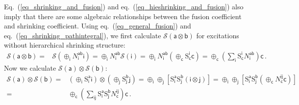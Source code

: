\documentclass[11pt,nofootinbib,preprint]{revtex4-1}
\begin{document}
Eq.~(\ref{eq_shrinking_and_fusion}) and eq.~(\ref{eq_hieshrinking_and_fusion}) also imply that there are some algebraic relationships between the fusion coefficient and shrinking coefficient. Using eq.~(\ref{eq_general_fusion}) and eq.~(\ref{eq_shrinking_pathintegral}), we first calculate $\mathcal{S} \left( \mathsf{a}\otimes \mathsf{b} \right)$ for excitations without hierarchical shrinking structure:
\begin{align}
	\mathcal{S} \left( \mathsf{a}\otimes \mathsf{b} \right) =&\mathcal{S} \left( \oplus _{\mathsf{i}}N_{\mathsf{i}}^{\mathsf{ab}}\mathsf{i} \right) =\oplus _{\mathsf{i}}N_{\mathsf{i}}^{\mathsf{ab}}\mathcal{S} \left( \mathsf{i} \right) =\oplus _{\mathsf{i}}N_{\mathsf{i}}^{\mathsf{ab}}\left( \oplus _{\mathsf{c}}\mathrm{S}_{\mathsf{c}}^{\mathsf{i}}\mathsf{c} \right) 
	=\oplus _{\mathsf{c}}\left( \sum_{\mathsf{i}}{\mathrm{S}_{\mathsf{c}}^{\mathsf{i}}N_{\mathsf{i}}^{\mathsf{ab}}} \right) \mathsf{c}	\,.
	\label{eq15}
\end{align}
Now we calculate $\mathcal{S} \left( \mathsf{a} \right) \otimes \mathcal{S} \left( \mathsf{b} \right)$:
\begin{align}
	\mathcal{S} \left( \mathsf{a} \right) \otimes \mathcal{S} \left( \mathsf{b} \right) =&\left( \oplus _{\mathsf{i}}\mathrm{S}_{\mathsf{i}}^{\mathsf{a}}\mathsf{i} \right) \otimes \left( \oplus _{\mathsf{j}}\mathrm{S}_{\mathsf{j}}^{\mathsf{b}}\mathsf{j} \right) =\oplus _{\mathsf{i}}\oplus _{\mathsf{j}}\left[ \mathrm{S}_{\mathsf{i}}^{\mathsf{a}}\mathrm{S}_{\mathsf{j}}^{\mathsf{b}}\left( \mathsf{i}\otimes \mathsf{j} \right) \right] =\oplus _{\mathsf{i}}\oplus _{\mathsf{j}}\left[ \mathrm{S}_{\mathsf{i}}^{\mathsf{a}}\mathrm{S}_{\mathsf{j}}^{\mathsf{b}}\left( \oplus _{\mathsf{c}}N_{\mathsf{c}}^{\mathsf{ij}}\mathsf{c} \right) \right] 	\nonumber\\
	=&\oplus _{\mathsf{c}}\left( \sum_{\mathsf{ij}}{\mathrm{S}_{\mathsf{i}}^{\mathsf{a}}\mathrm{S}_{\mathsf{j}}^{\mathsf{b}}N_{\mathsf{c}}^{\mathsf{ij}}} \right) \mathsf{c}\,.
	\label{eq17}
\end{align}
\end{document}
